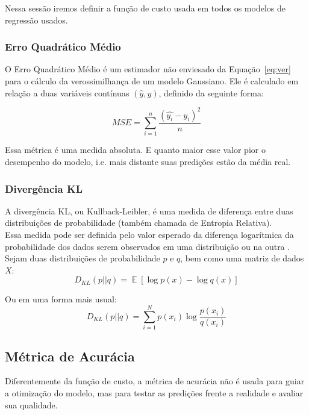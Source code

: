 Nessa sessão iremos definir a função de custo usada em todos os modelos de regressão usados. \\

\subsubsection{Erro Quadrático Médio}
\label{sec:MSE}

O Erro Quadrático Médio é um estimador não enviesado da Equação~\ref{eq:ver}
\citep{dlbook} para o cálculo da verossimilhança de um modelo Gaussiano. Ele é calculado em relação a duas variáveis contínuas
$(\hat{y},y)$, definido da seguinte forma:

\[MSE = \sum^n_{i=1}\frac{(\hat{y_i} - y_i)^2}{n}\]

Essa métrica é uma medida absoluta. E quanto maior esse valor pior o desempenho
do modelo, i.e. mais distante suas predições estão da média real. \\

\subsubsection{Divergência KL}

A divergência KL, ou Kullback-Leibler, é uma medida de diferença entre duas distribuições de probabilidade (também chamada de Entropia Relativa). \\
Essa medida pode ser definida pelo valor esperado da diferença logarítmica da probabilidade dos dados serem observados em uma distribuição ou na outra \citep{dlbook}. \\
Sejam duas distribuições de probabilidade $p$ e $q$, bem como uma matriz de dados $X$: \\

\[D_{KL}(p || q) = \mathop{\mathbb{E}}[\log p(x) - \log q(x)]​\]

Ou em uma forma mais usual: \\

\[D_{KL}(p||q) = \sum_{i=1}^{N}p(x_{i}) \log \frac{p(x_{i})}{q(x_{i})}​\]



\subsection{Métrica de Acurácia}

Diferentemente da função de custo, a métrica de acurácia não é usada para guiar a otimização do modelo,
mas para testar as predições frente a realidade e avaliar sua qualidade. \\


